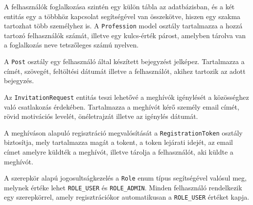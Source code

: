 \begin{reviewed}
A felhasználók foglalkozása szintén egy külön tábla az adatbázisban, és a két entitás egy a többhöz kapcsolat segítségével van összekötve, hiszen egy szakma tartozhat több személyhez is. A \texttt{Profession} model osztály tartalmazza a hozzá tartozó felhasználók számát, illetve egy kulcs-érték párost, amelyben tárolva van a foglalkozás neve tetszőleges számú nyelven.

A \texttt{Post} osztály egy felhasználó által készített bejegyzést jelképez. Tartalmazza a címét, szövegét, feltöltési dátumát illetve a felhasználót, akihez tartozik az adott bejegyzés.

Az \texttt{InvitationRequest} entitás teszi lehetővé a meghívók igénylését a közösséghez való csatlakozás érdekében. Tartalmazza  a meghívót kérő személy email címét, rövid motivációs levelét, önéletrajzát illetve az igénylés dátumát. 

A meghíváson alapuló regisztráció megvalósítását a \texttt{RegistrationToken} osztály biztosítja, mely tartalmazza magát a tokent, a token lejárati idejét, az email címet amelyre küldték a meghívót, illetve tárolja a felhasználót, aki küldte a meghívót. 

A szerepkör alapú jogosultságkezelés a \texttt{Role} enum típus segítségével valósul meg, melynek értéke lehet \texttt{ROLE\_USER} és \texttt{ROLE\_ADMIN}. Minden felhasználó rendelkezik egy szerepkörrel, amely regisztrációkor automatikusan a \texttt{ROLE\_USER} értéket kapja. 
\end{reviewed}
